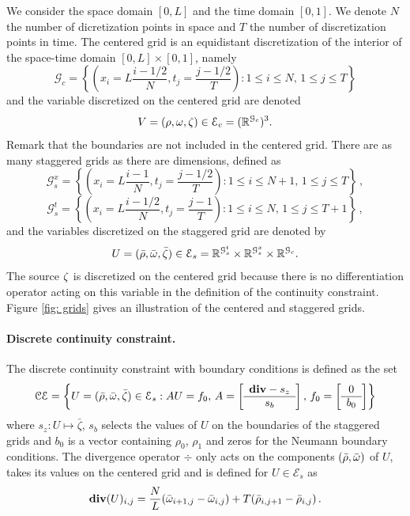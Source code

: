 
We consider the space domain $[0,L]$ and the time domain $[0,1]$. We denote $N$ the number of dicretization points in space and $T$ the number of discretization points in time. The centered grid is an equidistant discretization of the interior of the space-time domain $[0,L] \times [0,1]$, namely
\[
\mathcal{G}_c = \left\{ \left( x_i=L\frac{i-1/2}{N}, t_j=\frac{j-1/2}{T} \right): 1 \leq i \leq N, \, 1 \leq j \leq T \right\}
\]
and the variable discretized on the centered grid are denoted
\[
V = (\rho,\omega,\zeta) \in \mathcal{E}_c = (\mathbb{R}^{\mathcal{G}_c })^3.
\]
Remark that the boundaries are not included in the centered grid. There are as many staggered grids as there are dimensions, defined as
\[
\mathcal{G}_s^x = \left\{ (x_i = L\frac{i-1}{N}, t_j=\frac{j-1/2}{T}) :  1\leq i\leq N+1, \, 1\leq j \leq T \right\}\, ,
\]
\[
\mathcal{G}_s^t = \left\{ (x_i = L\frac{i-1/2}{N}, t_j=\frac{j-1}{T}) :  1\leq i\leq N, \, 1\leq j \leq T+1 \right\}\, , 
\]
and the variables discretized on the staggered grid are denoted by
\[
U = (\bar{\rho},\bar{\omega},\bar{\zeta}) \in \mathcal{E}_s = \mathbb{R}^{\mathcal{G}_s^t }\times \mathbb{R}^{\mathcal{G}_s^x }\times \mathbb{R}^{\mathcal{G}_c } .
\]
The source $\zeta$ is discretized on the centered grid because there is no differentiation operator acting on this variable in the definition of the continuity constraint. Figure \ref{fig: grids} gives an illustration of the centered and staggered grids.

\paragraph{Discrete continuity constraint.}
The discrete continuity constraint with boundary conditions is defined as the set
\begin{equation}
\label{eq_discretecontinuity}
\mathcal{CE} = \left\{   U= (\bar{\rho},\bar{\M},\bar{\Z}) \in \mathcal{E}_s :  AU = f_0 ,\, A = \left[
\begin{array}{c} 
\div - s_z \\ \hline 
s_b
\end{array}
\right]  , \, f_0 = \left[
\begin{array}{c}  
0  \\ \hline 
b_0
\end{array}
\right]  \right\}
\end{equation}
where $s_z : U \mapsto \bar{\zeta}$, $s_b$ selects the values of $U$ on the boundaries of the staggered grids and $b_0$  is a vector containing $\rho_0$, $\rho_1$ and zeros for the Neumann boundary conditions. The divergence operator $\div$ only acts on the components $(\bar{\rho},\bar{\omega})$ of $U$, takes its values on the centered grid and is defined for $U\in \mathcal{E}_s$ as 
\[
\textbf{div}(U)_{i,j} = \frac{N}{L} (\bar{\omega}_{i+1,j}-\bar{\omega}_{i,j}) + T (\bar{\rho}_{i,j+1}-\bar{\rho}_{i,j}) \, .
\]

